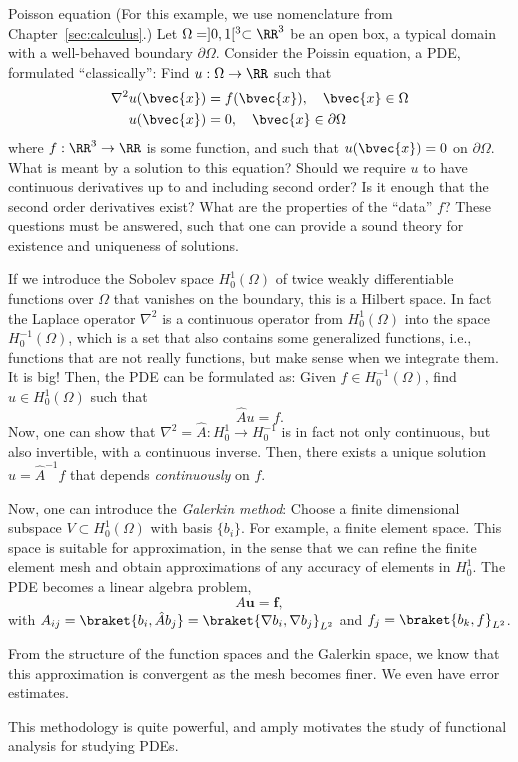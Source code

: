 \begin{myExample}{Poisson equation}{}
(For this example, we use nomenclature from Chapter~\ref{sec:calculus}.)
Let $\Omega = ]0,1[^3 \subset\RR^3$ be an open box, a typical domain with a well-behaved boundary $\partial\Omega$.
Consider the Poissin equation, a PDE, formulated ``classically'': Find $u : \Omega \to \RR$ such that
\begin{align}
 \nabla^2 u(\bvec{x}) &= f(\bvec{x}), 
  \quad \bvec{x} \in \Omega \\
 u(\bvec{x}) &= 0, \quad \bvec{x}\in\partial\Omega
\end{align}
where $f : \RR^3\to \RR$ is some function,
and such that $u(\bvec{x}) = 0$ on $\partial\Omega$. What is meant by a solution to this equation? Should we require $u$ to have continuous derivatives up to and including second order? Is it enough that the second order derivatives exist? What are the properties of the ``data'' $f$? These questions must be answered, such that one can provide a sound theory for existence and uniqueness of solutions.

If we introduce the Sobolev space $H^1_0(\Omega)$ of twice weakly differentiable functions over $\Omega$ that vanishes on the boundary, this is a Hilbert space. In fact the Laplace operator $\nabla^2$ is a continuous operator from $H^1_0(\Omega)$ into the space $H^{-1}_0(\Omega)$, which is a set that also contains some generalized functions, i.e., functions that are not really functions, but make sense when we integrate them. It is big! Then, the PDE can be formulated as: Given $f \in H^{-1}_0(\Omega)$, find $u \in H^1_0(\Omega)$ such that 
\begin{equation}
 \hat{A} u = f. 
\end{equation}
Now, one can show that $\nabla^2 = \hat{A} : H^1_0\to H^{-1}_0$ is in fact not only continuous, but also invertible, with a continuous inverse. Then, there exists a unique solution $u = \hat{A}^{-1} f$ that depends \emph{continuously} on $f$. 

Now, one can introduce the \emph{Galerkin method}: Choose a finite dimensional subspace $V \subset H^1_0(\Omega)$ with basis $\{b_i\}$. For example, a finite element space. This space is suitable for approximation, in the sense that we can refine the finite element mesh and obtain approximations of any accuracy of elements in $H^1_0$. The PDE becomes a linear algebra problem,
\begin{equation}
    A \mathbf{u} = \mathbf{f},
\end{equation}
with $A_{ij} = \braket{b_i,\hat{A} b_j} = \braket{\nabla b_i,\nabla b_j}_{L^2}$ and $f_j = \braket{b_k, f}_{L^2}$.

From the structure of the function spaces and the Galerkin space, we know that this approximation is convergent as the mesh becomes finer. We even have error estimates.

This methodology is quite powerful, and amply motivates the study of functional analysis for studying PDEs.
\end{myExample}

